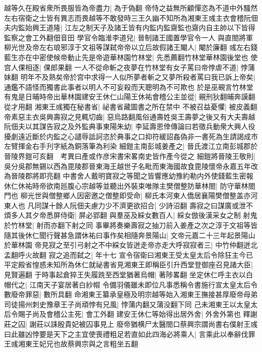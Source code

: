 越等久在殿省衆所畏服皆為帝盡力|{
	為于偽翻}
帝恃之益無所顧憚恣為不道中外騷然左右宿衛之士皆有異志而畏越等不敢發時三王久幽不知所為湘東王彧主衣會稽阮佃夫内監始興王道隆|{
	江左之制天子及諸王皆有内監内監齋監也齋内自主帥以下皆得監察之會工外翻佃音田}
學官令臨淮李道兒|{
	晉制諸王國置學官令一人}
與直閤將軍柳光世及帝左右琅邪淳于文祖等謀弑帝帝以立后故假諸王閹人|{
	閹於廉翻}
彧左右錢藍生亦在中密使候帝動止先是帝遊華林園竹林堂|{
	先悉薦翻竹林堂華林園後堂也}
使宫人倮相逐|{
	倮郎果翻}
一人不從命斬之夜夢在竹林堂有女子罵曰帝悖虐不道|{
	悖蒲妹翻}
明年不及熟矣帝於宫中求得一人似所夢者斬之又夢所殺者罵曰我已訴上帝矣|{
	通鑑不語怪而獨書此事者以明人不可妄殺而天聰明為不可欺也}
於是巫覡言竹林堂有鬼是日晡時帝出華林園建安王休仁山陽王休祐會稽公主並從|{
	覡刑狄翻晡奔謨翻從才用翻}
湘東王彧獨在秘書省|{
	祕書省藏圖書之所在禁中}
不被召益憂懼|{
	被皮義翻}
帝素惡主衣吳興壽寂之見輒切齒|{
	惡烏路翻風俗通壽姓吳王壽夢之後又有大夫壽越}
阮佃夫以其謀告寂之及外監典事東陽朱幼|{
	李延壽恩倖傳論曰若徵兵動衆大興人役擾劇遠近斷於内監之心譴辱詆訶恣於典事之口抑符緩詔姦偽非一書死為生請謁成市左臂揮金右手刋字紙為銅落筆為利染}
細鎧主南彭城姜產之|{
	晉氏渡江立南彭城郡於晉陵界鎧可亥翻　考異曰產或作彦宋書宋畧南史皆作產今從之}
細鎧將晉陵王敬則|{
	吳分吳郡無錫以西為毘陵郡晉東海王越世子名毗而東海國故食毘陵懷帝永嘉五年改為晉陵郡將即亮翻}
中書舍人戴明寶寂之等聞之皆響應幼豫約勒内外使錢藍生密報休仁休祐時帝欲南廵腹心宗越等並聽出外裝束唯隊主樊僧整防華林閤|{
	防守華林閤門也}
柳光世與僧整鄉人因密邀之僧整即受命|{
	柳氏本河東人僑居襄陽樊僧整盖亦河東人也}
凡同謀十餘人阮佃夫慮力少不濟更欲招合|{
	少詩沼翻}
壽寂之曰謀廣或泄不煩多人其夕帝悉屏侍衛|{
	屏必郢翻}
與羣巫及綵女數百人|{
	綵女倣後漢采女之制}
射鬼於竹林堂|{
	射而亦翻下射之同}
事畢將奏樂壽寂之抽刀前入姜產之次之淳于文祖等皆隨其後休仁聞行聲甚急謂休祐曰事作矣相隨奔景陽山|{
	文帝元嘉二十三年起景陽山於華林園}
帝見寂之至引弓射之不中綵女皆迸走帝亦走大呼寂寂者三|{
	中竹仲翻迸北孟翻呼火故翻}
寂之追而弑之|{
	年十七}
宣令宿衛曰湘東王受太皇太后令除狂主今已平定殿省惶惑未知所為休仁就祕書省見湘東王即稱臣引升西堂登御座召見諸大臣|{
	見賢遍翻}
于時事起倉猝王失履跣至西堂猶著烏帽|{
	著陟畧翻}
坐定休仁呼主衣以白帽代之|{
	江南天子宴居著白紗㡌}
令備羽儀雖未即位凡事悉稱令書施行宣太皇太后令數廢帝罪惡|{
	數所具翻}
命湘東王纂承皇極及明宗越等始入湘東王撫接甚厚廢帝母弟司徒揚州刺史豫章王子尚頑悖有兄風|{
	悖蒲内翻又蒲没翻下同}
己未湘東王以太皇太后令賜子尚及會稽公主死|{
	會工外翻}
建安王休仁等始得出居外舍|{
	外舍外第也}
釋謝莊之囚|{
	謝莊以誄殷貴妃被囚事見上}
廢帝猶横尸太醫閤口蔡興宗謂尚書右僕射王彧曰此雖凶悖要是天下之主宜使喪禮粗足若直如此四海必將乘人|{
	言乘此以奉辭伐罪王彧湘東王妃兄也故蔡興宗與之言粗坐五翻}
